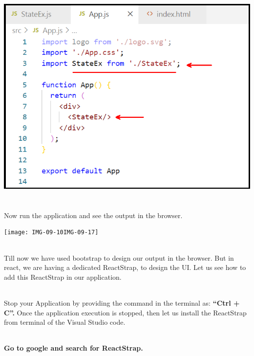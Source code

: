\documentclass{article}
\begin{document}
\begin{center}
	\noindent \includegraphics*[width=5.40in, height=4.08in]{IMG-09-16}
\end{center}

\noindent 

\noindent 

\noindent 

\noindent 

\noindent 

\noindent \\
Now run the application and see the output in the browser.

\begin{center}
	\noindent \texttt{[image: IMG-09-10IMG-09-17]}
\end{center}

\noindent 

\noindent \\
Till now we have used bootstrap to design our output in the browser. But in react, we are having a dedicated ReactStrap, to design the UI. Let us see how to add this ReactStrap in our application.

\noindent 

\noindent \\
Stop your Application by providing the command in the terminal as: \textbf{``Ctrl + C''.}  Once the application execution is stopped, then let us install the ReactStrap from terminal of the Visual Studio code.

\noindent 

\noindent \\
\textbf{Go to google and search for ReactStrap.}
\end{document}
